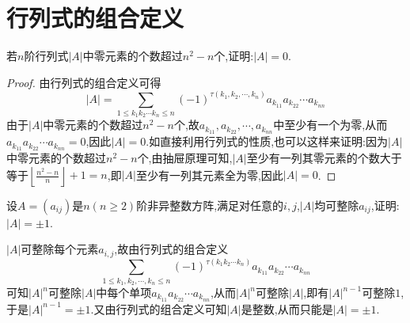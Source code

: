 \documentclass[../../main.tex]{subfiles}%
\begin{document}
\section{行列式的组合定义}

\begin{example}
若\(n\)阶行列式\(\vert A\vert\)中零元素的个数超过\(n^2 - n\)个,证明:\(\vert A\vert = 0\).
\end{example}
\begin{proof}
由行列式的组合定义可得
\[
|A|=\sum_{1\leqslant  k_1k_2\cdots k_n\leqslant  n}(-1)^{\tau (k_1,k_2,\cdots,k_n)}a_{k_{11}}a_{k_{22}}\cdots a_{k_{nn}}
\]
由于\(|A|\)中零元素的个数超过\(n^2 - n\)个,故\(a_{k_{11}},a_{k_{22}},\cdots,a_{k_{nn}}\)中至少有一个为零,从而\(a_{k_{11}}a_{k_{22}}\cdots a_{k_{nn}} = 0\),因此\(|A| = 0\).如直接利用行列式的性质,也可以这样来证明:因为\(|A|\)中零元素的个数超过\(n^2 - n\)个,由抽屉原理可知,\(|A|\)至少有一列其零元素的个数大于等于\(\left\lfloor\frac{n^2 - n}{n}\right\rfloor+ 1=n\),即\(|A|\)至少有一列其元素全为零,因此\(|A| = 0\).
\end{proof}

\begin{example}
设\(A=(a_{ij})\)是\(n(n\geqslant 2)\)阶非异整数方阵,满足对任意的\(i,j\),\(\vert A\vert\)均可整除\(a_{ij}\),证明:\(\vert A\vert=\pm1\).
\end{example}
\begin{solution}
\(\vert A\vert\)可整除每个元素\(a_{i,j}\),故由行列式的组合定义
\[
\sum_{1\leqslant k_1,k_2,\cdots ,k_n\leqslant n}{\left( -1 \right) ^{\tau \left( k_1k_2\cdots k_n \right)}a_{k_{11}}a_{k_{22}}\cdots a_{k_{nn}}}
\]
可知\(\vert A\vert^n\)可整除\(\vert A\vert\)中每个单项\(a_{k_{11}}a_{k_{22}}\cdots a_{k_{nn}}\),从而\(\vert A\vert^n\)可整除\(\vert A\vert\),即有\(\vert A\vert^{n - 1}\)可整除\(1\),于是\(\vert A\vert^{n - 1}=\pm1\).又由行列式的组合定义可知\(\vert A\vert\)是整数,从而只能是\(\vert A\vert=\pm1\).

\end{solution}
\end{document}
